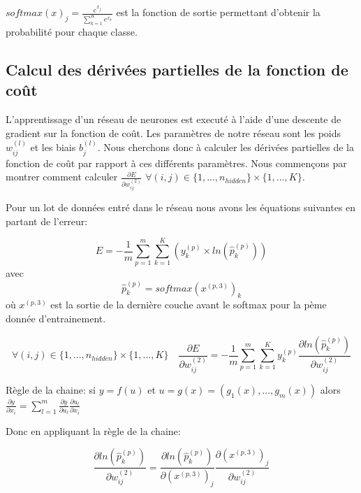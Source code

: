 \documentclass[a4paper,11pt,oneside,roman]{article}
\begin{document}
    $softmax(x)_j = \frac{e^{x_j}}{\sum\limits_{k=1}^K e^{x_k}}$ est la fonction de sortie permettant d'obtenir la probabilité pour chaque classe.

    \subsection{Calcul des dérivées partielles de la fonction de coût}

    L'apprentissage d'un réseau de neurones est executé à l'aide d'une descente de gradient sur la fonction de coût. Les paramètres de notre réseau sont les poids $w_{ij}^{(l)}$ et les biais $b_j^{(l)}$.
    Nous cherchons donc à calculer les dérivées partielles de la fonction de coût par rapport à ces différents paramètres. Nous commençons par montrer comment calculer $\frac{\partial E}{\partial w_{ij}^{(2)}}$ $\forall (i,j) \in \{1, ..., n_{hidden}\} \times \{1, ..., K\}.$

    Pour un lot de données entré dans le réseau nous avons les équations suivantes en partant de l'erreur:
    
    \begin{equation}
        \nonumber
        E = -\frac{1}{m} \sum\limits_{p=1}^m\sum\limits_{k=1}^K (y_{k}^{(p)} \times ln(\hat{p}_{k}^{(p)}))
    \end{equation}
avec 
    \begin{equation}
        \nonumber
        \hat{p}_{k}^{(p)} = softmax(x^{(p,3)})_k
    \end{equation}
    où $x^{(p,3)}$ est la sortie de la dernière couche avant le softmax pour la pème donnée d'entrainement.

    \begin{equation}
        \nonumber
        \forall (i,j) \in \{1, ..., n_{hidden}\} \times \{1, ..., K\} \quad
        \frac{\partial E}{\partial w_{ij}^{(2)}} = -\frac{1}{m} \sum\limits_{p=1}^{m} \sum\limits_{k=1}^{K} y_k^{(p)} \frac{\partial ln(\hat{p}_{k}^{(p)})}{\partial w_{ij}^{(2)}}
    \end{equation}

    Règle de la chaine:
    si $y = f(u)$ et $u=g(x)=(g_1(x), ..., g_m(x))$ alors $\frac{\partial y}{\partial x_i} = \sum\limits_{l=1}^{m} \frac{\partial y}{\partial u_l} \frac{\partial u_l}{\partial x_i}$
    
    Donc en appliquant la règle de la chaine:
    
    \begin{equation}
        \nonumber
        \frac{\partial ln(\hat{p}_{k}^{(p)})}{\partial w_{ij}^{(2)}} = \frac{\partial ln(\hat{p}_{k}^{(p)})}{\partial (x^{(p,3)})_{j}} \frac{\partial (x^{(p,3)})_{j}}{\partial w_{ij}^{(2)}}
    \end{equation}
\end{document}
